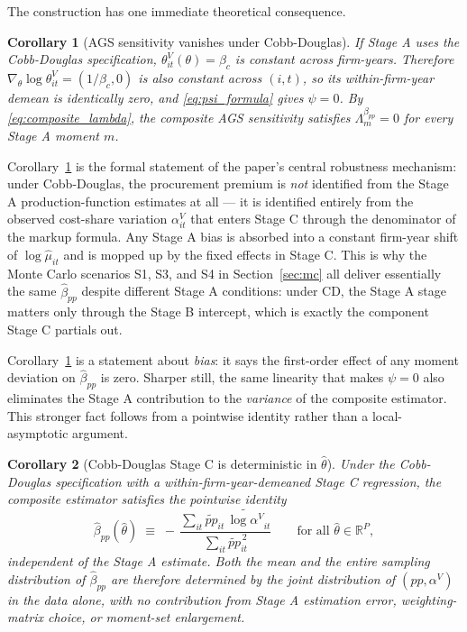 \documentclass[11pt]{article}
\newtheorem{corollary}{Corollary}
\begin{document}
The construction has one immediate theoretical consequence.

\begin{corollary}[AGS sensitivity vanishes under Cobb-Douglas]\label{cor:cd_zero}
If Stage A uses the Cobb-Douglas specification, $\theta^V_{it}(\theta) = \beta_c$ is constant across firm-years. Therefore $\nabla_\theta \log\theta^V_{it} = (1/\beta_c, 0)$ is also constant across $(i,t)$, so its within-firm-year demean is identically zero, and \eqref{eq:psi_formula} gives $\psi = 0$. By \eqref{eq:composite_lambda}, the composite AGS sensitivity satisfies $\Lambda^{\beta_{pp}}_m = 0$ for every Stage A moment $m$.
\end{corollary}

Corollary~\ref{cor:cd_zero} is the formal statement of the paper's central robustness mechanism: under Cobb-Douglas, the procurement premium is \emph{not} identified from the Stage A production-function estimates at all --- it is identified entirely from the observed cost-share variation $\alpha^V_{it}$ that enters Stage C through the denominator of the markup formula. Any Stage A bias is absorbed into a constant firm-year shift of $\log\hat\mu_{it}$ and is mopped up by the fixed effects in Stage C. This is why the Monte Carlo scenarios S1, S3, and S4 in Section~\ref{sec:mc} all deliver essentially the same $\hat\beta_{pp}$ despite different Stage A conditions: under CD, the Stage A stage matters only through the Stage B intercept, which is exactly the component Stage C partials out.

Corollary~\ref{cor:cd_zero} is a statement about \emph{bias}: it says the first-order effect of any moment deviation on $\hat\beta_{pp}$ is zero. Sharper still, the same linearity that makes $\psi = 0$ also eliminates the Stage A contribution to the \emph{variance} of the composite estimator. This stronger fact follows from a pointwise identity rather than a local-asymptotic argument.

\begin{corollary}[Cobb-Douglas Stage C is deterministic in $\hat\theta$]\label{cor:cd_deterministic}
Under the Cobb-Douglas specification with a within-firm-year-demeaned Stage C regression, the composite estimator satisfies the pointwise identity
\begin{equation}\label{eq:cd_deterministic}
\hat\beta_{pp}(\hat\theta) \;\equiv\; -\,\frac{\sum_{it}\widetilde{pp}_{it}\,\widetilde{\log\alpha^V}_{it}}{\sum_{it}\widetilde{pp}_{it}^{\,2}} \qquad \text{for all } \hat\theta \in \mathbb{R}^P,
\end{equation}
independent of the Stage A estimate. Both the mean and the entire sampling distribution of $\hat\beta_{pp}$ are therefore determined by the joint distribution of $(pp, \alpha^V)$ in the data alone, with no contribution from Stage A estimation error, weighting-matrix choice, or moment-set enlargement.
\end{corollary}
\end{document}
